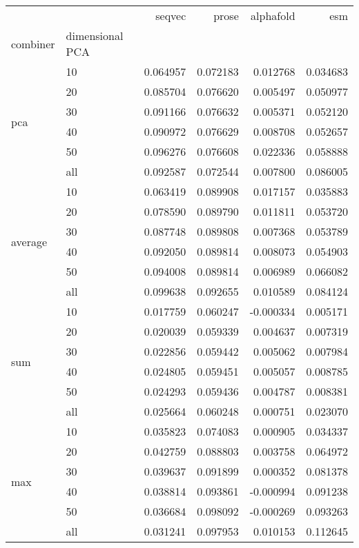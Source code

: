\begin{tabular}{llrrrr}
\toprule
 &  & seqvec & prose & alphafold & esm \\
combiner & dimensional PCA &  &  &  &  \\
\midrule
\multirow[t]{6}{*}{pca} & 10 & 0.064957 & 0.072183 & 0.012768 & 0.034683 \\
 & 20 & 0.085704 & 0.076620 & 0.005497 & 0.050977 \\
 & 30 & 0.091166 & 0.076632 & 0.005371 & 0.052120 \\
 & 40 & 0.090972 & 0.076629 & 0.008708 & 0.052657 \\
 & 50 & 0.096276 & 0.076608 & 0.022336 & 0.058888 \\
 & all & 0.092587 & 0.072544 & 0.007800 & 0.086005 \\
\cline{1-6}
\multirow[t]{6}{*}{average} & 10 & 0.063419 & 0.089908 & 0.017157 & 0.035883 \\
 & 20 & 0.078590 & 0.089790 & 0.011811 & 0.053720 \\
 & 30 & 0.087748 & 0.089808 & 0.007368 & 0.053789 \\
 & 40 & 0.092050 & 0.089814 & 0.008073 & 0.054903 \\
 & 50 & 0.094008 & 0.089814 & 0.006989 & 0.066082 \\
 & all & 0.099638 & 0.092655 & 0.010589 & 0.084124 \\
\cline{1-6}
\multirow[t]{6}{*}{sum} & 10 & 0.017759 & 0.060247 & -0.000334 & 0.005171 \\
 & 20 & 0.020039 & 0.059339 & 0.004637 & 0.007319 \\
 & 30 & 0.022856 & 0.059442 & 0.005062 & 0.007984 \\
 & 40 & 0.024805 & 0.059451 & 0.005057 & 0.008785 \\
 & 50 & 0.024293 & 0.059436 & 0.004787 & 0.008381 \\
 & all & 0.025664 & 0.060248 & 0.000751 & 0.023070 \\
\cline{1-6}
\multirow[t]{6}{*}{max} & 10 & 0.035823 & 0.074083 & 0.000905 & 0.034337 \\
 & 20 & 0.042759 & 0.088803 & 0.003758 & 0.064972 \\
 & 30 & 0.039637 & 0.091899 & 0.000352 & 0.081378 \\
 & 40 & 0.038814 & 0.093861 & -0.000994 & 0.091238 \\
 & 50 & 0.036684 & 0.098092 & -0.000269 & 0.093263 \\
 & all & 0.031241 & 0.097953 & 0.010153 & 0.112645 \\
\cline{1-6}
\bottomrule
\end{tabular}
